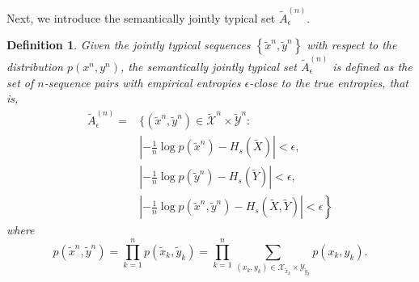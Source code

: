 \documentclass[12pt, draftclsnofoot,onecolumn]{IEEEtran}
\newtheorem{definition}{\bf{Definition}}
\begin{document}
Next, we introduce the semantically jointly typical set $\tilde{A}_{\epsilon}^{(n)}$.
\begin{definition}\label{Sem_JTS}
Given the jointly typical sequences $\left\{\tilde{x}^n,\tilde{y}^n\right\}$ with respect to the distribution $p(x^n,y^n)$, the semantically jointly typical set ${\tilde{A}}_{\epsilon}^{(n)}$ is defined as the set of $n$-sequence pairs with empirical entropies $\epsilon$-close to the true entropies, that is,
\begin{equation}
\begin{aligned}
{\tilde{A}}_{\epsilon}^{(n)}=&\bigg\{\left(\tilde{x}^n,\tilde{y}^n\right)\in \tilde{\mathcal{X}}^n\times \tilde{\mathcal{Y}}^n:\\
                                              &\left|-\frac{1}{n}\log p\left(\tilde{x}^n \right)-H_s(\tilde{X})\right|<\epsilon, \\
                                              &\left|-\frac{1}{n}\log p\left(\tilde{y}^n \right)-H_s(\tilde{Y})\right|<\epsilon, \\
                                              & \left.\left|-\frac{1}{n}\log p\left(\tilde{x}^n,\tilde{y}^n\right)-H_s(\tilde{X},\tilde{Y})\right|<\epsilon\right\}
\end{aligned}
\end{equation}
where
\begin{equation}
p\left(\tilde{x}^n,\tilde{y}^n\right)=\prod_{k=1}^{n} p(\tilde{x}_k,\tilde{y}_k)=\prod_{k=1}^{n} \sum_{(x_k,y_k)\in {\mathcal{X}_{\tilde{x}_k}\times \mathcal{Y}_{\tilde{y}_k}}}p(x_k,y_k).
\end{equation}
\end{definition}
\end{document}
